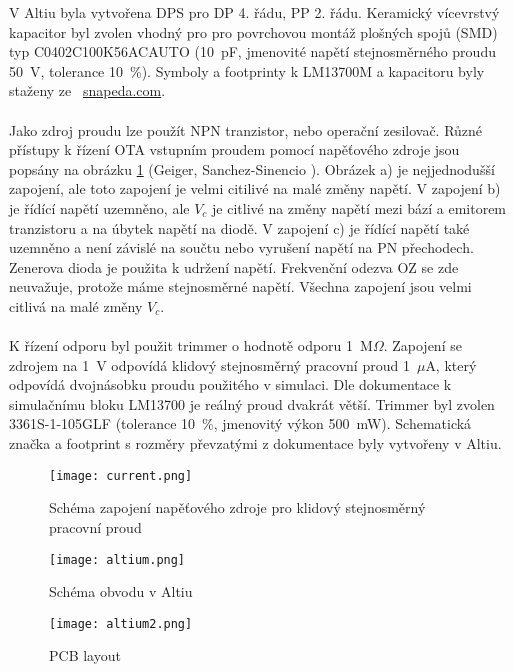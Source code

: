 \noindent V Altiu byla vytvořena DPS pro DP 4. řádu, PP 2. řádu. Keramický vícevrstvý kapacitor byl zvolen vhodný pro pro povrchovou montáž plošných spojů (SMD) typ C0402C100K56ACAUTO (10~pF, jmenovité napětí stejnosměrného proudu 50~V, tolerance 10~\%). Symboly a footprinty k LM13700M a kapacitoru byly staženy ze~ \url{snapeda.com}. \\
\\
Jako zdroj proudu lze použít NPN tranzistor, nebo operační zesilovač. Různé přístupy k řízení OTA vstupním proudem pomocí napěťového zdroje jsou popsány na obrázku \ref{s:DC} (Geiger, Sanchez-Sinencio \cite{25}). Obrázek a) je nejjednodušší zapojení, ale toto zapojení je velmi citilivé na malé změny napětí. V zapojení b) je řídící napětí uzemněno, ale $V_c$ je citlivé na změny napětí mezi bází a emitorem tranzistoru a na úbytek napětí na diodě. V zapojení c) je řídící napětí také uzemněno a není závislé na součtu nebo vyrušení napětí na PN přechodech. Zenerova dioda je použita k udržení napětí. Frekvenční odezva OZ se zde neuvažuje, protože máme stejnosměrné napětí. Všechna zapojení jsou velmi citlivá na malé změny $V_c$. \\
\\
K řízení odporu byl použit trimmer o hodnotě odporu 1~M$\Omega$. Zapojení se zdrojem na 1~V odpovídá klidový stejnosměrný pracovní proud 1~$\mu$A, který odpovídá dvojnásobku proudu použitého v simulaci. Dle dokumentace k simulačnímu bloku LM13700 je reálný proud dvakrát větší. Trimmer byl zvolen 3361S-1-105GLF (tolerance 10~\%, jmenovitý výkon 500~mW). Schematická značka a footprint s rozměry převzatými z dokumentace byly vytvořeny v Altiu.
\begin{figure}[h]
\centering
\texttt{[image: current.png]}
\caption{Schéma zapojení napěťového zdroje pro klidový stejnosměrný pracovní proud \label{s:DC}}
\end{figure}
\begin{figure}[h]
\centering
\texttt{[image: altium.png]}
\caption{Schéma obvodu v Altiu}
\end{figure}
\begin{figure}[h]
\centering
\texttt{[image: altium2.png]}
\caption{PCB layout}
\end{figure}
